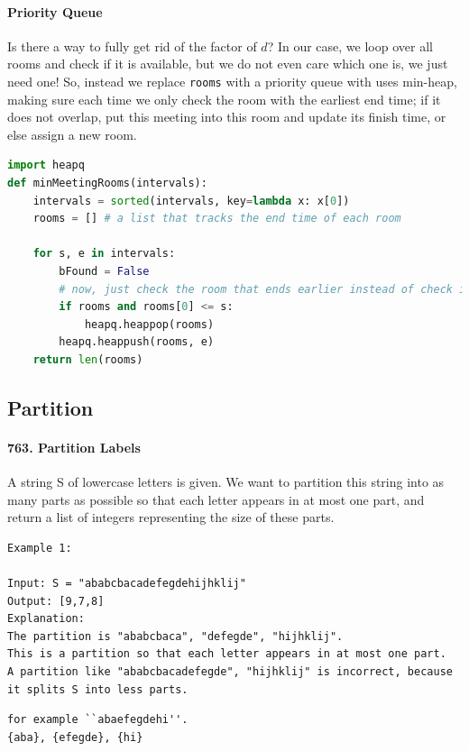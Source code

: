 \documentclass[../main.tex]{subfiles}
\begin{document}
\paragraph{Priority Queue} Is there a way to fully get rid of the factor of $d$? In our case, we loop over all rooms and check if it is available, but we do not even care which one is, we just need one! So, instead we replace \texttt{rooms} with a priority queue with uses min-heap, making sure each time we only check the room with the earliest end time; if it does not overlap, put this meeting into this room and update its finish time,  or else assign a new room.
\begin{lstlisting}[language=Python]
import heapq
def minMeetingRooms(intervals):
    intervals = sorted(intervals, key=lambda x: x[0])
    rooms = [] # a list that tracks the end time of each room
    
    for s, e in intervals:
        bFound = False
        # now, just check the room that ends earlier instead of check it all
        if rooms and rooms[0] <= s:
            heapq.heappop(rooms)
        heapq.heappush(rooms, e)
    return len(rooms)
\end{lstlisting}
\subsection{Partition} 
\paragraph{763. Partition Labels}   A string S of lowercase letters is given. We want to partition this string into as many parts as possible so that each letter appears in at most one part, and return a list of integers representing the size of these parts.

\begin{lstlisting}[numbers=none]
Example 1:

Input: S = "ababcbacadefegdehijhklij"
Output: [9,7,8]
Explanation:
The partition is "ababcbaca", "defegde", "hijhklij".
This is a partition so that each letter appears in at most one part.
A partition like "ababcbacadefegde", "hijhklij" is incorrect, because it splits S into less parts.
\end{lstlisting}

\begin{lstlisting}[numbers=none]
for example ``abaefegdehi''.
{aba}, {efegde}, {hi}
\end{lstlisting}
\end{document}
